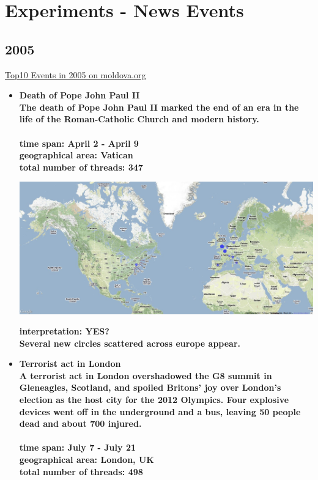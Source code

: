 \documentclass[11pt,a4paper,english]{article}
\begin{document}
 \newpage

	\section{Experiments - News Events}
			\subsection{2005}
			\href{http://politicom.moldova.org/news/10-most-important-world-events-of-2005-7712-eng.html}{Top10 Events in 2005 on moldova.org}
				\begin{itemize}
				\item \bf Death of Pope John Paul II\rm
					\\ The death of Pope John Paul II marked the end of an era in the life of the Roman-Catholic Church and modern history. 
					\\\\ \bf time span: \rm April 2 - April 9
					\\ \bf geographical area: \rm Vatican
					\\ \bf total number of threads: \rm 347
					
					\includegraphics[width=130mm]{img/post-pope}
						
					\bf interpretation: \rm YES?
					\\ Several new circles scattered across europe appear.
						


				\item \bf Terrorist act in London \rm
					\\ A terrorist act in London overshadowed the G8 summit in Gleneagles, Scotland, and spoiled Britons' joy over London's election as the host city for the 2012 Olympics. Four explosive devices went off in the underground and a bus, leaving 50 people dead and about 700 injured.
					\\\\ \bf time span: \rm July 7 - July 21
					\\ \bf geographical area: \rm London, UK
					\\ \bf total number of threads: \rm 498
					

\end{itemize}
\end{document}
